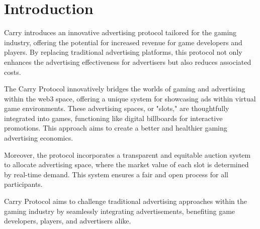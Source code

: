 \section{Introduction}
Carry introduces an innovative advertising protocol tailored for the gaming industry, offering the potential for increased revenue for game developers and players. By replacing traditional advertising platforms, this protocol not only enhances the advertising effectiveness for advertisers but also reduces associated costs.

The Carry Protocol innovatively bridges the worlds of gaming and advertising within the web3 space, offering a unique system for showcasing ads within virtual game environments. These advertising spaces, or "slots," are thoughtfully integrated into games, functioning like digital billboards for interactive promotions. This approach aims to create a better and healthier gaming advertising economics.

Moreover, the protocol incorporates a transparent and equitable auction system to allocate advertising space, where the market value of each slot is determined by real-time demand. This system ensures a fair and open process for all participants.

Carry Protocol aims to challenge traditional advertising approaches within the gaming industry by seamlessly integrating advertisements, benefiting game developers, players, and advertisers alike.


